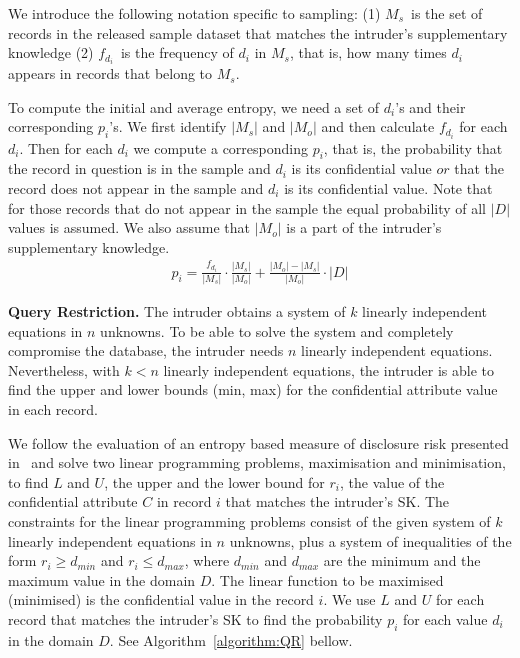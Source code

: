 \documentclass{llncs}
\begin{document}
We introduce the following notation specific to sampling:
(1)  $M_{s}$~is the set of records in the released sample dataset
  that matches the intruder's supplementary knowledge
(2) $f_{d_{i}}$~is the frequency of $d_{i}$ in $M_{s}$, that is,
  how many times $d_{i}$ appears in records that belong to $M_{s}$.

To compute the initial and average entropy, we need a set
of $d_{i}$'s and their corresponding $p_{i}$'s. We first identify
$|M_{s}|$ and $|M_{o}|$ and then calculate $f_{d_{i}}$ for each
$d_i$. Then for each $d_i$ we compute a corresponding $p_{i}$,
that is, the probability that the record in question is in the
sample and $d_{i}$ is its confidential value $or$ that the record
does not appear in the sample and $d_{i}$ is its confidential
value. Note that for those records that do not appear in the sample the
equal probability of all $|D|$ values is assumed. We also assume
that $|M_{o}|$ is a part of the intruder's supplementary
knowledge.
\begin{eqnarray}
                    \nonumber  p_{i} = \frac{f_{d_{i}}}{|M_{s}|} \cdot \frac{|M_{s}|}{|M_{o}|} + \frac{|M_{o}|-|M_{s}|}{|M_{o}|} \cdot|D|
\end{eqnarray}

\textbf{Query Restriction.} The intruder obtains a system of $k$ linearly independent
equations in $n$ unknowns. To be able to solve the system and
completely compromise the database, the intruder needs $n$
linearly independent equations. Nevertheless, with $k < n$
linearly independent equations, the intruder is able to find the
upper and lower bounds (min, max) for the confidential attribute
value in each record.

We follow the evaluation of an entropy based measure of disclosure
risk presented in~\cite{Oganian-Ferrer:Posteriori03} and solve two
linear programming problems, maximisation and minimisation, to
find $L$ and $U$, the upper and the lower bound for $r_i$, the
value of the confidential attribute $C$ in record $i$ that matches
the intruder's SK. The constraints for the linear programming
problems consist of the given system of $k$ linearly independent
equations in $n$ unknowns, plus a system of inequalities of the
form $r_i \geq d_{min}$ and $r_i \leq d_{max}$, where $d_{min}$
and $d_{max}$ are the minimum and the maximum value in the domain
$D$. The linear function to be maximised (minimised) is the
confidential value in the record $i$. We use $L$ and $U$ for each
record that matches the intruder's SK to find the probability
$p_{i}$ for each value $d_i$ in the domain $D$. See
Algorithm~\ref{algorithm:QR} bellow.
\end{document}
